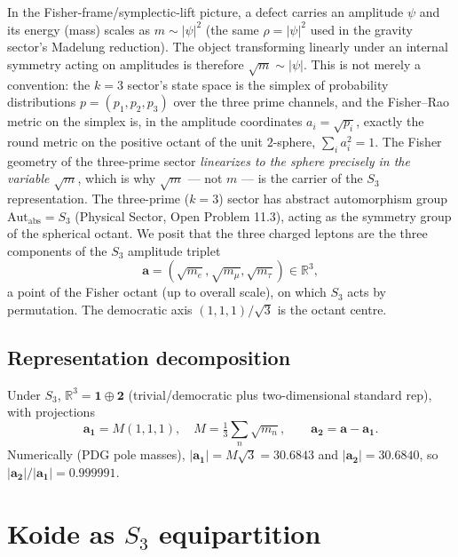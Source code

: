 \documentclass[12pt]{article}
\theoremstyle{definition}
\theoremstyle{remark}
\begin{document}
In the Fisher-frame/symplectic-lift picture, a defect carries an amplitude
$\psi$ and its energy (mass) scales as $m\sim|\psi|^2$ (the same
$\rho=|\psi|^2$ used in the gravity sector's Madelung reduction). The object
transforming linearly under an internal symmetry acting on amplitudes is
therefore $\sqrt m\sim|\psi|$. This is not merely a convention: the $k=3$
sector's state space is the simplex of probability distributions
$p=(p_1,p_2,p_3)$ over the three prime channels, and the Fisher--Rao metric on
the simplex is, in the amplitude coordinates $a_i=\sqrt{p_i}$, exactly the
round metric on the positive octant of the unit $2$-sphere,
$\sum_i a_i^2=1$. The Fisher geometry of the three-prime sector
\emph{linearizes to the sphere precisely in the variable $\sqrt m$}, which is
why $\sqrt m$ --- not $m$ --- is the carrier of the $S_3$ representation. The
three-prime ($k=3$) sector has abstract automorphism group
$\mathrm{Aut}_{\mathrm{abs}}=S_3$ (Physical Sector, Open Problem 11.3), acting
as the symmetry group of the spherical octant. We posit that the three charged
leptons are the three components of the $S_3$ amplitude triplet
\begin{equation}
\boldsymbol a = (\sqrt{m_e},\sqrt{m_\mu},\sqrt{m_\tau})\in\mathbb{R}^3,
\end{equation}
a point of the Fisher octant (up to overall scale), on which $S_3$ acts by
permutation. The democratic axis $(1,1,1)/\sqrt3$ is the octant centre.

\subsection{Representation decomposition}

Under $S_3$, $\mathbb{R}^3=\mathbf 1\oplus\mathbf 2$ (trivial/democratic plus
two-dimensional standard rep), with projections
\begin{equation}
\boldsymbol a_{\mathbf 1}=M(1,1,1),\quad M=\tfrac13\textstyle\sum_n\sqrt{m_n},
\qquad \boldsymbol a_{\mathbf 2}=\boldsymbol a-\boldsymbol a_{\mathbf 1}.
\end{equation}
Numerically (PDG pole masses),
$|\boldsymbol a_{\mathbf 1}|=M\sqrt3=30.6843$ and
$|\boldsymbol a_{\mathbf 2}|=30.6840$, so
$|\boldsymbol a_{\mathbf 2}|/|\boldsymbol a_{\mathbf 1}|=0.999991$.

\section{Koide as $S_3$ equipartition}
\end{document}
